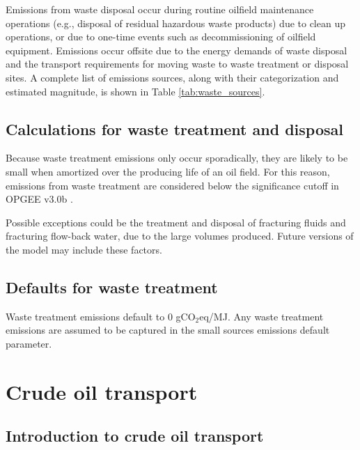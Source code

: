 \documentclass[11pt]{report}
\newcommand{\version}{v3.0b }
\begin{document}
Emissions from waste disposal occur during routine oilfield maintenance operations (e.g., disposal of residual hazardous waste products) due to clean up operations, or due to one-time events such as decommissioning of oilfield equipment. Emissions occur offsite due to the energy demands of waste disposal and the transport requirements for moving waste to waste treatment or disposal sites. A complete list of emissions sources, along with their categorization and estimated magnitude, is shown in Table \ref{tab:waste_sources}.


\subsection{Calculations for waste treatment and disposal}

Because waste treatment emissions only occur sporadically, they are likely to be small when amortized over the producing life of an oil field. For this reason, emissions from waste treatment are considered below the significance cutoff in OPGEE \version.

Possible exceptions could be the treatment and disposal of fracturing fluids and fracturing flow-back water, due to the large volumes produced. Future versions of the model may include these factors.

\subsection{Defaults for waste treatment}

Waste treatment emissions default to 0 gCO$_2$eq/MJ. Any waste treatment emissions are assumed to be captured in the small sources emissions default parameter. 



\clearpage

\section{Crude oil transport}
 \label{sec:transport}

\subsection{Introduction to crude oil transport}
\end{document}

